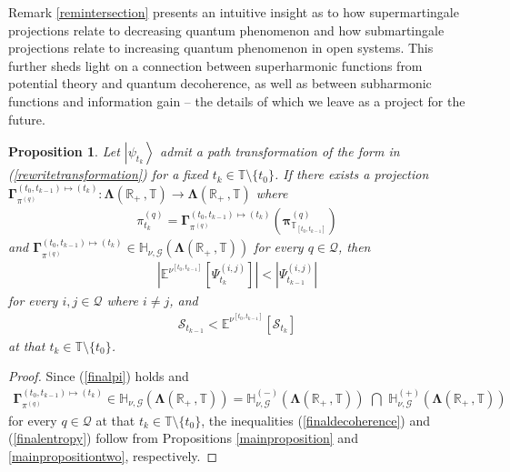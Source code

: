 \documentclass[12pt,a4paper]{article}
\newtheorem{prop}[thm]{Proposition}
\def\R{\mathbb{R}}
\def\T{\mathbb{T}}
\def\G{\mathscr{G}}
\begin{document}
%
Remark \ref{remintersection} presents an intuitive insight as to how supermartingale projections relate to decreasing quantum phenomenon and how submartingale projections relate to increasing quantum phenomenon in open systems. This further sheds light on a connection between superharmonic functions from potential theory and quantum decoherence, as well as between subharmonic functions and information gain -- the details of which we leave as a project for the future.
%
\begin{prop}
\label{mainpropositiongeneralcombine}
Let $\left|\psi_{t_{k}}\right\rangle$ admit a path transformation of the form in {\rm(\ref{rewritetransformation})} for a fixed $t_k\in\T\setminus\{t_0\}$. If there exists a projection $\boldsymbol{\Gamma}_{\pi^{(q)}}^{(t_0,t_{k-1})\mapsto(t_k)}: \boldsymbol{\Lambda}(\R_+ \,, \T) \rightarrow \boldsymbol{\Lambda}(\R_+ \,, \T)$ where 
\begin{align}
\pi^{(q)}_{t_{k}} = \boldsymbol{\Gamma}_{\pi^{(q)}}^{(t_0,t_{k-1})\mapsto(t_k)}\left(  \boldsymbol{\pi}_{\T_{[t_0,t_{k-1}]}}^{(q)} \right) \label{finalpi}
\end{align}
and $\boldsymbol{\Gamma}_{\pi^{(q)}}^{(t_0,t_{k-1})\mapsto(t_k)} \in \mathbb{H}_{\nu,\G}(\boldsymbol{\Lambda}(\R_+ \,, \T))$ for every $q\in\mathcal{Q}$, then
\begin{align}
\left| \mathbb{E}^{\nu^{[t_{0},t_{k-1}]}}\left[\Psi_{t_{k}}^{(i,j)}\right] \right| < \left| \Psi_{t_{k-1}}^{(i,j)} \right| \label{finaldecoherence}
\end{align}
for every $i,j\in\mathcal{Q}$ where $i\neq j$, and 
\begin{align}
\mathcal{S}_{t_{k-1}} < \mathbb{E}^{\nu^{[t_{0},t_{k-1}]}}\left[\mathcal{S}_{t_{k}}\right] \label{finalentropy}
\end{align}
at that $t_k\in\T\setminus\{t_0\}$.
\end{prop}
\begin{proof}
Since (\ref{finalpi}) holds and 
\begin{align}
\boldsymbol{\Gamma}_{\pi^{(q)}}^{(t_0,t_{k-1})\mapsto(t_k)} \in \mathbb{H}_{\nu,\G}(\boldsymbol{\Lambda}(\R_+ \,, \T)) = \mathbb{H}^{(-)}_{\nu,\G}(\boldsymbol{\Lambda}(\R_+ \,, \T)) \,\, \bigcap \,\, \mathbb{H}^{(+)}_{\nu,\G}(\boldsymbol{\Lambda}(\R_+ \,, \T)) 
\end{align}
for every $q\in\mathcal{Q}$ at that $t_k\in\T\setminus\{t_0\}$, the inequalities (\ref{finaldecoherence}) and (\ref{finalentropy}) follow from Propositions \ref{mainproposition} and \ref{mainpropositiontwo}, respectively.
\end{proof}
\end{document}
